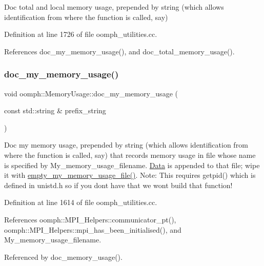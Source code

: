 Doc total and local memory usage, prepended by string (which allows identification from where the function is called, say) 

Definition at line 1726 of file oomph\+\_\+utilities.\+cc.



References doc\+\_\+my\+\_\+memory\+\_\+usage(), and doc\+\_\+total\+\_\+memory\+\_\+usage().

\mbox{\label{namespaceoomph_1_1MemoryUsage_a43f39ca6f2e6040903ec86b46eb760dd}} 
\subsubsection{\texorpdfstring{doc\+\_\+my\+\_\+memory\+\_\+usage()}{doc\_my\_memory\_usage()}}
{\footnotesize\ttfamily void oomph\+::\+Memory\+Usage\+::doc\+\_\+my\+\_\+memory\+\_\+usage (\begin{DoxyParamCaption}\item[{const std\+::string \&}]{prefix\+\_\+string }\end{DoxyParamCaption})}



Doc my memory usage, prepended by string (which allows identification from where the function is called, say) that records memory usage in file whose name is specified by My\+\_\+memory\+\_\+usage\+\_\+filename. \hyperlink{classoomph_1_1Data}{Data} is appended to that file; wipe it with \hyperlink{namespaceoomph_1_1MemoryUsage_aadcb42d5c4ca8099981d75b2d5adcd96}{empty\+\_\+my\+\_\+memory\+\_\+usage\+\_\+file()}. Note\+: This requires getpid() which is defined in unistd.\+h so if you don\textquotesingle{}t have that we won\textquotesingle{}t build that function! 



Definition at line 1614 of file oomph\+\_\+utilities.\+cc.



References oomph\+::\+M\+P\+I\+\_\+\+Helpers\+::communicator\+\_\+pt(), oomph\+::\+M\+P\+I\+\_\+\+Helpers\+::mpi\+\_\+has\+\_\+been\+\_\+initialised(), and My\+\_\+memory\+\_\+usage\+\_\+filename.



Referenced by doc\+\_\+memory\+\_\+usage().

